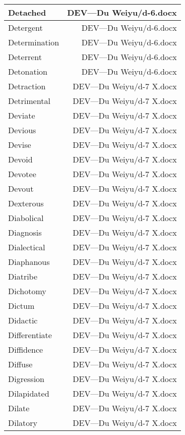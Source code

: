 \documentclass{article}
\begin{document}
\begin{center}
\begin{longtable}{|l|r|}
\hline
Detached  &  DEV---Du Weiyu/d-6.docx\\  
\hline
Detergent  &  DEV---Du Weiyu/d-6.docx\\  
\hline
Determination  &  DEV---Du Weiyu/d-6.docx\\  
\hline
Deterrent  &  DEV---Du Weiyu/d-6.docx\\  
\hline
Detonation  &  DEV---Du Weiyu/d-6.docx\\  
\hline
Detraction  &  DEV---Du Weiyu/d-7 X.docx\\  
\hline
Detrimental  &  DEV---Du Weiyu/d-7 X.docx\\  
\hline
Deviate  &  DEV---Du Weiyu/d-7 X.docx\\  
\hline
Devious  &  DEV---Du Weiyu/d-7 X.docx\\  
\hline
Devise  &  DEV---Du Weiyu/d-7 X.docx\\  
\hline
Devoid  &  DEV---Du Weiyu/d-7 X.docx\\  
\hline
Devotee  &  DEV---Du Weiyu/d-7 X.docx\\  
\hline
Devout  &  DEV---Du Weiyu/d-7 X.docx\\  
\hline
Dexterous  &  DEV---Du Weiyu/d-7 X.docx\\  
\hline
Diabolical  &  DEV---Du Weiyu/d-7 X.docx\\  
\hline
Diagnosis  &  DEV---Du Weiyu/d-7 X.docx\\  
\hline
Dialectical  &  DEV---Du Weiyu/d-7 X.docx\\  
\hline
Diaphanous  &  DEV---Du Weiyu/d-7 X.docx\\  
\hline
Diatribe  &  DEV---Du Weiyu/d-7 X.docx\\  
\hline
Dichotomy  &  DEV---Du Weiyu/d-7 X.docx\\  
\hline
Dictum  &  DEV---Du Weiyu/d-7 X.docx\\  
\hline
Didactic  &  DEV---Du Weiyu/d-7 X.docx\\  
\hline
Differentiate  &  DEV---Du Weiyu/d-7 X.docx\\  
\hline
Diffidence  &  DEV---Du Weiyu/d-7 X.docx\\  
\hline
Diffuse  &  DEV---Du Weiyu/d-7 X.docx\\  
\hline
Digression  &  DEV---Du Weiyu/d-7 X.docx\\  
\hline
Dilapidated  &  DEV---Du Weiyu/d-7 X.docx\\  
\hline
Dilate  &  DEV---Du Weiyu/d-7 X.docx\\  
\hline
Dilatory  &  DEV---Du Weiyu/d-7 X.docx\\  

\end{longtable}
\end{center}
\end{document}
